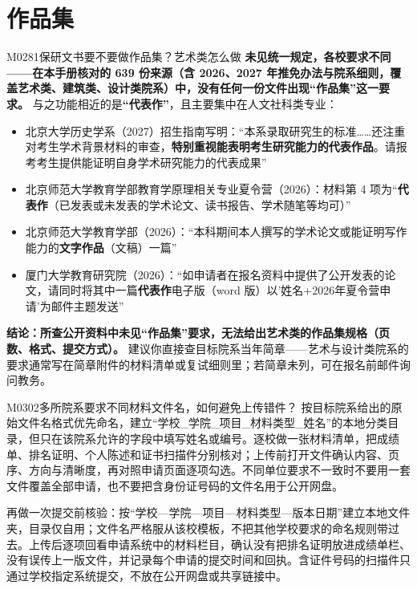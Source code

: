 \section{作品集}
\begin{qa}{M0281}{保研文书要不要做作品集？艺术类怎么做}
\textbf{未见统一规定，各校要求不同——在本手册核对的 639 份来源（含 2026、2027 年推免办法与院系细则，覆盖艺术类、建筑类、设计类院系）中，没有任何一份文件出现“作品集”这一要求。} 与之功能相近的是\textbf{“代表作”}，且主要集中在人文社科类专业：

\begin{itemize}
  \item 北京大学历史学系（2027）招生指南写明：“本系录取研究生的标准……还注重对考生学术背景材料的审查，\textbf{特别重视能表明考生研究能力的代表作品}。请报考考生提供能证明自身学术研究能力的代表成果”
  \item 北京师范大学教育学部教育学原理相关专业夏令营（2026）：材料第 4 项为“\textbf{代表作}（已发表或未发表的学术论文、读书报告、学术随笔等均可）”
  \item 北京师范大学教育学部（2026）：“本科期间本人撰写的学术论文或能证明写作能力的\textbf{文字作品}（文稿）一篇”
  \item 厦门大学教育研究院（2026）：“如申请者在报名资料中提供了公开发表的论文，请同时将其中一篇\textbf{代表作}电子版（word 版）以'姓名+2026年夏令营申请'为邮件主题发送”
\end{itemize}

\textbf{结论：所查公开资料中未见“作品集”要求，无法给出艺术类的作品集规格（页数、格式、提交方式）。} 建议你直接查目标院系当年简章——艺术与设计类院系的要求通常写在简章附件的材料清单或复试细则里；若简章未列，可在报名前邮件询问教务。
\end{qa}


\begin{qa}{M0302}{多所院系要求不同材料文件名，如何避免上传错件？}
按目标院系给出的原始文件名格式优先命名，建立“学校\_学院\_项目\_材料类型\_姓名”的本地分类目录，但只在该院系允许的字段中填写姓名或编号。逐校做一张材料清单，把成绩单、排名证明、个人陈述和证书扫描件分别核对；上传前打开文件确认内容、页序、方向与清晰度，再对照申请页面逐项勾选。不同单位要求不一致时不要用一套文件覆盖全部申请，也不要把含身份证号码的文件名用于公开网盘。

再做一次提交前核验：按“学校—学院—项目—材料类型—版本日期”建立本地文件夹，目录仅自用；文件名严格服从该校模板，不把其他学校要求的命名规则带过去。上传后逐项回看申请系统中的材料栏目，确认没有把排名证明放进成绩单栏、没有误传上一版文件，并记录每个申请的提交时间和回执。含证件号码的扫描件只通过学校指定系统提交，不放在公开网盘或共享链接中。
\end{qa}

